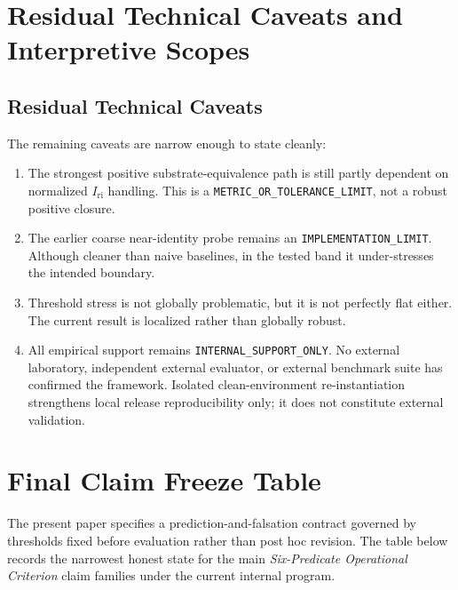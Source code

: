 \documentclass[11pt,a4paper]{article}
\newcommand{\Iri}{I_{\mathrm{ri}}}
\newcommand{\Status}[1]{\texttt{#1}}
\begin{document}
\section{Residual Technical Caveats and Interpretive Scopes}
\subsection{Residual Technical Caveats}
The remaining caveats are narrow enough to state cleanly:
\begin{enumerate}[leftmargin=1.5em]
\item The strongest positive substrate-equivalence path is still partly dependent on normalized $\Iri$ handling. This is a \Status{METRIC\_OR\_TOLERANCE\_LIMIT}, not a robust positive closure.
\item The earlier coarse near-identity probe remains an \Status{IMPLEMENTATION\_LIMIT}. Although cleaner than naive baselines, in the tested band it under-stresses the intended boundary.
\item Threshold stress is not globally problematic, but it is not perfectly flat either. The current result is localized rather than globally robust.
\item All empirical support remains \Status{INTERNAL\_SUPPORT\_ONLY}. No external laboratory, independent external evaluator, or external benchmark suite has confirmed the framework. Isolated clean-environment re-instantiation strengthens local release reproducibility only; it does not constitute external validation.
\end{enumerate}

\section{Final Claim Freeze Table}
The present paper specifies a prediction-and-falsation contract governed by thresholds fixed before evaluation rather than post hoc revision. The table below records the narrowest honest state for the main \textit{Six-Predicate Operational Criterion} claim families under the current internal program.
\end{document}
